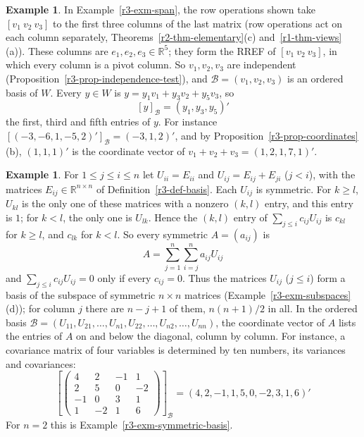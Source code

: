 \documentclass[12pt]{article}
\newcommand{\R}{\mathbb R}
\theoremstyle{definition}
\newtheorem{example}[theorem]{Example}
\begin{document}
\begin{example}\label{r3-exm-coordinates}
In Example~\ref{r3-exm-span}, the row operations shown take \([v_1\ v_2\ v_3]\) to the first three
columns of the last matrix (row operations act on each column separately,
Theorems~\ref{r2-thm-elementary}(c) and~\ref{r1-thm-views}(a)). These columns are \(e_1,e_2,e_3\in\R^5\);
they form the RREF of \([v_1\ v_2\ v_3]\), in which every column is a pivot column. So \(v_1,v_2,v_3\) are independent
(Proposition~\ref{r3-prop-independence-test}), and \(\mathcal B=(v_1,v_2,v_3)\) is an ordered basis of
\(W\). Every \(y\in W\) is \(y=y_1v_1+y_3v_2+y_5v_3\), so
\[
[y]_{\mathcal B}=(y_1,y_3,y_5)'
\]
the first, third and fifth entries of \(y\). For instance \([(-3,-6,1,-5,2)']_{\mathcal B}=(-3,1,2)'\),
and by Proposition~\ref{r3-prop-coordinates}(b), \((1,1,1)'\) is the coordinate vector of
\(v_1+v_2+v_3=(1,2,1,7,1)'\).
\end{example}

\begin{example}\label{r3-exm-symmetric-coordinates}
For \(1\leqslant j\leqslant i\leqslant n\) let \(U_{ii}=E_{ii}\) and \(U_{ij}=E_{ij}+E_{ji}\) (\(j<i\)),
with the matrices \(E_{ij}\in\R^{n\times n}\) of Definition~\ref{r3-def-basis}. Each \(U_{ij}\) is
symmetric. For \(k\geqslant l\), \(U_{kl}\) is the only one of these matrices with a nonzero
\((k,l)\) entry, and this entry is \(1\); for \(k<l\), the only one is \(U_{lk}\). Hence the \((k,l)\)
entry of \(\sum_{j\leqslant i}c_{ij}U_{ij}\) is \(c_{kl}\) for \(k\geqslant l\), and \(c_{lk}\) for
\(k<l\). So every symmetric \(A=(a_{ij})\) is
\[
A=\sum_{j=1}^n\sum_{i=j}^na_{ij}U_{ij}
\]
and \(\sum_{j\leqslant i}c_{ij}U_{ij}=0\) only if every \(c_{ij}=0\). Thus the matrices \(U_{ij}\)
(\(j\leqslant i\)) form a basis of the subspace of symmetric \(n\times n\) matrices
(Example~\ref{r3-exm-subspaces}(d)); for column \(j\) there are \(n-j+1\) of them, \(n(n+1)/2\) in all.
In the ordered basis \(\mathcal B=(U_{11},U_{21},\dots,U_{n1},U_{22},\dots,U_{n2},\dots,U_{nn})\), the
coordinate vector of \(A\) lists the entries of \(A\) on and below the diagonal, column by column. For instance, a
covariance matrix of four variables is determined by ten numbers, its variances and covariances:
\[
\left[\begin{pmatrix}4&2&-1&1\\2&5&0&-2\\-1&0&3&1\\1&-2&1&6\end{pmatrix}\right]_{\mathcal B}=(4,2,-1,1,5,0,-2,3,1,6)'
\]
For \(n=2\) this is Example~\ref{r3-exm-symmetric-basis}.
\end{example}
\end{document}

